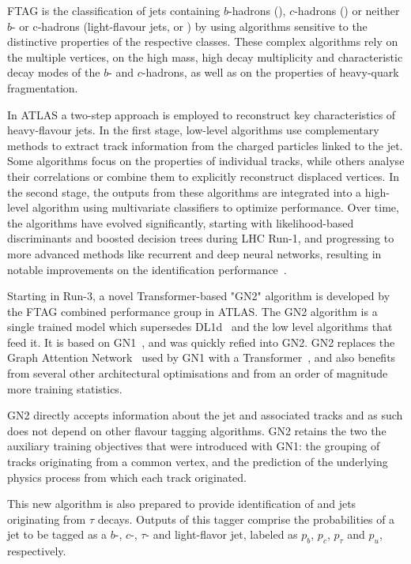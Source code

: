 \ac{FTAG} is the classification of jets containing \(b\)-hadrons (\bjets), \(c\)-hadrons (\cjets) or neither \(b\)-
or c-hadrons (light-flavour jets, or \ljets) by using algorithms sensitive to the distinctive properties of the respective classes.
These complex algorithms rely on the multiple vertices, on the high mass, high decay multiplicity and characteristic decay modes of the \(b\)- and \(c\)-hadrons, as well as on the properties of heavy-quark fragmentation.


In \ac{ATLAS} a two-step approach is employed to reconstruct key characteristics of heavy-flavour jets. In the first stage, low-level algorithms use complementary methods to extract track information from the charged particles linked to the jet. Some algorithms focus on the properties of individual tracks, while others analyse their correlations or combine them to explicitly reconstruct displaced vertices. In the second stage, the outputs from these algorithms are integrated into a high-level algorithm using multivariate classifiers to optimize performance. Over time, the algorithms have evolved significantly, starting with likelihood-based discriminants and boosted decision trees during \ac{LHC} Run-1, and progressing to more advanced methods like recurrent and deep neural networks, resulting in notable improvements on the identification performance~\cite{ATLAS-FTAG-Calibration-2012,ATLAS-FTAG-Efficiency-2012,MV2Algorithm,ATLAS-FTAG-DeepLearning}.

Starting in Run-3, a novel Transformer-based "GN2" algorithm is developed by the \ac{FTAG} combined performance group in \ac{ATLAS}. The GN2 algorithm is a single trained model which supersedes DL1d~\cite{ATLAS-FTAG-DL1-Run2} and the low level algorithms that feed it. It is based on GN1~\cite{ATLAS-FTAG-GN1}, and was quickly refied into GN2. GN2 replaces the Graph Attention Network~\cite{GANs} used by GN1 with a Transformer~\cite{GN2Transformer}, and also benefits from several other architectural optimisations and from an order of magnitude more training statistics.

GN2 directly accepts information about the jet and associated tracks and as such does not depend on other flavour tagging algorithms. GN2 retains the two the auxiliary training objectives that were introduced with GN1: the grouping of tracks originating from a common vertex, and the prediction of the underlying physics process from which each track originated.

This new algorithm is also prepared to provide identification of \cjets and jets originating from \(\tau\) decays. Outputs of this tagger comprise the probabilities of a jet to be tagged as a \(b\)-, \(c\)-, \(\tau\)- and light-flavor jet, labeled as \(p_b\), \(p_c\), \(p_{\tau}\) and \(p_u\), respectively.

